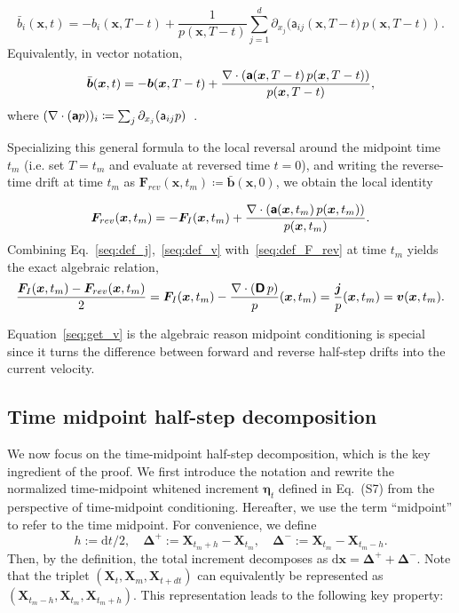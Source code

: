 \begin{equation}
    \bar{b}_i(\bm{x}, t)=
    -b_i(\bm{x},T-t)+
    \frac{1}{p(\bm{x},T-t)}
    \sum_{j=1}^d
    \partial_{x_j}(\mathsf{a}_{ij}\left(\bm{x},T-t)\,p(\bm{x},T-t)\right).
    \label{seq:def_reversed_drift}
\end{equation}
Equivalently, in vector notation,
\begin{equation*}
    \bar{\bm{b}}(\bm{x}, t)=
    -\bm{b}(\bm{x},T-t)+
    \frac{
    \nabla\cdot\left(
    \boldsymbol{\mathsf{a}}(\bm{x},T-t)\,p(\bm{x},T-t)
    \right)
    }{p(\bm{x},T-t)},
    \label{seq:def_reversed_drift_vec}
\end{equation*}
where $(\nabla\cdot(\boldsymbol{\mathsf{a}}p))_i\coloneq\sum_j\partial_{x_j}(\mathsf{a}_{ij}p)$~\cite{haussmann1986time}.

Specializing this general formula to the local reversal around the midpoint time $t_m$ (i.e. set $T=t_m$ and evaluate at reversed time $t=0$), and writing the reverse-time drift at time $t_m$ as $\bm{F}_{rev}(\bm{x},t_m)\coloneq\bar{\bm{b}}(\bm{x},0)$, we obtain the local identity

\begin{equation}
    \bm{F}_{rev}(\bm{x},t_m)=-
    \bm{F}_I(\bm{x},t_m)+
    \frac{\nabla\cdot(\boldsymbol{\mathsf{a}}(\bm{x},t_m)\,p(\bm{x},t_m))}{p(\bm{x},t_m)}.
    \label{seq:def_F_rev}
\end{equation}
Combining Eq.~\eqref{seq:def_j},~\eqref{seq:def_v} with~\eqref{seq:def_F_rev} at time $t_m$ yields the exact algebraic relation,
\begin{equation}
    \frac{\bm{F}_I(\bm{x},t_m)-\bm{F}_{rev}(\bm{x},t_m)}{2}=
    \bm{F}_I(\bm{x},t_m)-
    \frac{\nabla\cdot(\boldsymbol{\mathsf{D}}\,p)}{p}(\bm{x},t_m)=
    \frac{\bm{j}}{p}(\bm{x},t_m)=\bm{v}(\bm{x},t_m).
    \label{seq:get_v}
\end{equation}

Equation~\eqref{seq:get_v} is the algebraic reason midpoint conditioning is special since it turns the difference between forward and reverse half-step drifts into the current velocity.

\subsection{Time midpoint half-step decomposition}
\vspace*{-0.8\baselineskip}
We now focus on the time-midpoint half-step decomposition, which is the key ingredient of the proof. 
We first introduce the notation and rewrite the normalized time-midpoint whitened increment $\bm\eta_t$ defined in Eq.~(S7) from the perspective of time-midpoint conditioning. 
Hereafter, we use the term ``midpoint'' to refer to the time midpoint. 
For convenience, we define
\[
h := \mathrm{d}t/2, \quad \bm\Delta^+ := \bm{X}_{t_m+h} - \bm{X}_{t_m}, \quad \bm\Delta^- := \bm{X}_{t_m} - \bm{X}_{t_m-h}.
\]
Then, by the definition, the total increment decomposes as $\mathrm{d}\bm{x} = \bm\Delta^+ + \bm\Delta^-$.  
Note that the triplet $(\bm{X}_t, \bm{X}_m, \bm{X}_{t+dt})$ can equivalently be represented as $(\bm{X}_{t_m-h}, \bm{X}_{t_m}, \bm{X}_{t_m+h})$. 
This representation leads to the following key property:

